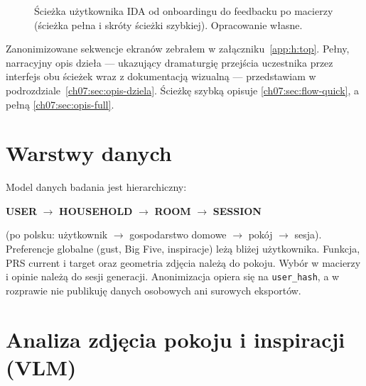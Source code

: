 \begin{figure}[htbp]
  \centering
  \caption{Ścieżka użytkownika IDA od onboardingu do feedbacku po macierzy (ścieżka pełna i skróty ścieżki szybkiej). Opracowanie własne.}
  \label{fig:ch07:flow}
\end{figure}

Zanonimizowane sekwencje ekranów zebrałem w załączniku~\ref{app:h:top}. Pełny, narracyjny opis dzieła --- ukazujący dramaturgię przejścia uczestnika przez interfejs obu ścieżek wraz z dokumentacją wizualną --- przedstawiam w podrozdziale~\ref{ch07:sec:opis-dziela}. Ścieżkę szybką opisuje \ref{ch07:sec:flow-quick}, a pełną \ref{ch07:sec:opis-full}.



\section{Warstwy danych}
\label{ch07:sec:warstwy}

Model danych badania jest hierarchiczny:

\begin{center}
\textbf{USER} $\rightarrow$ \textbf{HOUSEHOLD} $\rightarrow$ \textbf{ROOM} $\rightarrow$ \textbf{SESSION}
\end{center}

\noindent
(po polsku: użytkownik $\rightarrow$ gospodarstwo domowe $\rightarrow$ pokój $\rightarrow$ sesja). Preferencje globalne (gust, Big Five, inspiracje) leżą bliżej użytkownika. Funkcja, PRS current i target oraz geometria zdjęcia należą do pokoju. Wybór w macierzy i opinie należą do sesji generacji. Anonimizacja opiera się na \texttt{user\_hash}, a w rozprawie nie publikuję danych osobowych ani surowych eksportów.

\section{Analiza zdjęcia pokoju i inspiracji (VLM)}
\label{ch07:sec:vlm}

